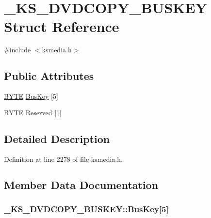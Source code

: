 \hypertarget{struct___k_s___d_v_d_c_o_p_y___b_u_s_k_e_y}{}\section{\+\_\+\+K\+S\+\_\+\+D\+V\+D\+C\+O\+P\+Y\+\_\+\+B\+U\+S\+K\+EY Struct Reference}
\label{struct___k_s___d_v_d_c_o_p_y___b_u_s_k_e_y}


{\ttfamily \#include $<$ksmedia.\+h$>$}

\subsection*{Public Attributes}
\begin{DoxyCompactItemize}
\item 
\hyperlink{mapinls_8h_a4ae1dab0fb4b072a66584546209e7d58}{B\+Y\+TE} \hyperlink{struct___k_s___d_v_d_c_o_p_y___b_u_s_k_e_y_a44c74a4c2c0132aa7b48b168966bcc67}{Bus\+Key} \mbox{[}5\mbox{]}
\item 
\hyperlink{mapinls_8h_a4ae1dab0fb4b072a66584546209e7d58}{B\+Y\+TE} \hyperlink{struct___k_s___d_v_d_c_o_p_y___b_u_s_k_e_y_ac66decf2c289c84038930cc6c9358b12}{Reserved} \mbox{[}1\mbox{]}
\end{DoxyCompactItemize}


\subsection{Detailed Description}


Definition at line 2278 of file ksmedia.\+h.



\subsection{Member Data Documentation}
\subsubsection[{\texorpdfstring{Bus\+Key}{BusKey}}]{ \+\_\+\+K\+S\+\_\+\+D\+V\+D\+C\+O\+P\+Y\+\_\+\+B\+U\+S\+K\+E\+Y\+::\+Bus\+Key\mbox{[}5\mbox{]}}\hypertarget{struct___k_s___d_v_d_c_o_p_y___b_u_s_k_e_y_a44c74a4c2c0132aa7b48b168966bcc67}{}\label{struct___k_s___d_v_d_c_o_p_y___b_u_s_k_e_y_a44c74a4c2c0132aa7b48b168966bcc67}



